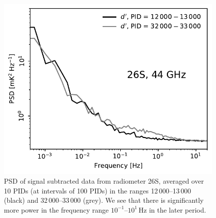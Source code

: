 \documentclass[twocolumn]{aa}
\begin{document}
\begin{figure}
	\begin{center}
		\includegraphics[width=\linewidth]{figs/ps_running_mean_26S.pdf}
	\end{center}
	\caption{PSD of signal subtracted data from radiometer 26S, averaged over 10 PIDs (at intervals of 100 PIDs) in the ranges 
    12\,000--13\,000 (black) and 32\,000--33\,000 (grey). We see that there is
    significantly more power in the frequency range $10^{-1}$--$10^1$\,Hz in the later period. 
		\label{fig:ps_compare_26S}}
\end{figure}
\end{document}
